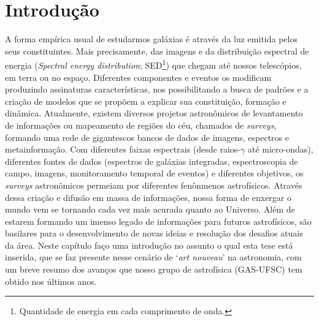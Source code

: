 



\chapter{Introdução}
\label{sec:intro}

A forma empírica usual de estudarmos galáxias é através da luz emitida pelos seus constituintes. Mais precisamente, das imagens e da distribuição espectral de energia ({\em Spectral energy distribution}; SED\footnote{Quantidade de energia em cada comprimento de onda.}) que chegam até nossos telescópios, em terra ou no espaço. Diferentes componentes e eventos os modificam produzindo assinaturas características, nos possibilitando a busca de padrões e a criação de modelos que se propõem a explicar sua constituição, formação e dinâmica. Atualmente, existem diversos projetos astronômicos de levantamento de informações ou mapeamento de regiões do céu, chamados de {\em surveys}, formando uma rede de gigantescos bancos de dados de imagens, espectros e metainformação. Com diferentes faixas espectrais (desde raios-$\gamma$ até micro-ondas), diferentes fontes de dados (espectros de galáxias integradas, espectroscopia de campo, imagens, monitoramento temporal de eventos) e diferentes objetivos, os {\em surveys} astronômicos permeiam por diferentes fenônmenos astrofísicos. Através dessa criação e difusão em massa de informações, nossa forma de enxergar o mundo vem se tornando cada vez mais acurada quanto ao Universo. Além de estarem formando um imenso legado de informações para futuros astrofísicos, são basilares para o desenvolvimento de novas ideias e resolução dos desafios atuais da área. Neste capítulo faço uma introdução no assunto o qual esta tese está inserida, que se faz presente nesse cenário de `{\em art nouveau}' na astronomia, com um breve resumo dos avanços que nosso grupo de astrofísica (GAS-UFSC) tem obtido nos últimos anos.


